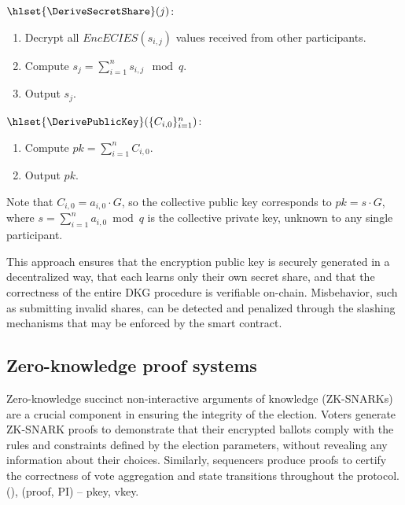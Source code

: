 \begin{mdframed}
	\begin{itemize}
	{\color{blue} 
		\item[$\bullet$] $\hlset{\DeriveSecretShare}(j)$:
		\begin{enumerate}
			\item Decrypt all $EncECIES(s_{i,j})$ values received from other participants.
			\item Compute $s_j = \sum_{i=1}^n s_{i,j} \mod q$.
			\item Output $s_j$.
		\end{enumerate}
	}
	\end{itemize}
\end{mdframed}

\begin{mdframed}
	\begin{itemize}
		{\color{blue} 
			\item[$\bullet$] $\hlset{\DerivePublicKey}(\{C_{i,0}\}_{i=1}^n)$:
			\begin{enumerate}
				\item Compute $pk = \sum_{i=1}^n C_{i,0}$.
				\item Output $pk$.
			\end{enumerate}
			Note that $C_{i,0} = a_{i,0}\cdot G$, so the collective public key corresponds to $pk = s \cdot G$, where $s = \sum_{i=1}^n a_{i,0} \bmod q$ is the collective private key, unknown to any single participant.
		}
	\end{itemize}
\end{mdframed}

This approach ensures that the encryption public key is securely generated in a decentralized way, that each \keywarden learns only their own secret share, and that the correctness of the entire \ac{DKG} procedure is verifiable on-chain. Misbehavior, such as submitting invalid shares, can be detected and penalized through the slashing mechanisms that may be enforced by the smart contract.%

\subsection{Zero-knowledge proof systems}
\label{sec:cryptographic-primitives:zkp}

{Zero-knowledge succinct non-interactive arguments of knowledge (ZK-SNARKs)} are a crucial component in ensuring the integrity of the election. Voters generate ZK-SNARK proofs to demonstrate that their encrypted ballots comply with the rules and constraints defined by the election parameters, without revealing any information about their choices. Similarly, sequencers produce proofs to certify the correctness of vote aggregation and state transitions throughout the protocol. {\color{blue}\hlset{\PProve}(), \hlset{\PVerify}(proof, PI) -- pkey, vkey.}

